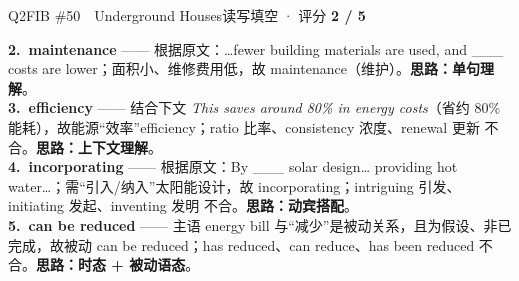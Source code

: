 \documentclass[11pt]{article}
\begin{document}
\begin{qblock}{Q2\quad FIB \#50\ \ Underground Houses}{读写填空 · 评分 \textcolor{cAccent}{\bfseries 2 / 5}}
\begin{notebox}
\textbf{2.\ maintenance} —— 根据原文：…fewer building materials are used, and \_\_\_ costs are lower；面积小、维修费用低，故 maintenance（维护）。\textbf{思路：单句理解}。\\[2pt]
\textbf{3.\ efficiency} —— 结合下文 \emph{This saves around 80\% in energy costs}（省约 80\% 能耗），故能源“效率”efficiency；ratio 比率、consistency 浓度、renewal 更新 不合。\textbf{思路：上下文理解}。\\[2pt]
\textbf{4.\ incorporating} —— 根据原文：By \_\_\_ solar design… providing hot water…；需“引入/纳入”太阳能设计，故 incorporating；intriguing 引发、initiating 发起、inventing 发明 不合。\textbf{思路：动宾搭配}。\\[2pt]
\textbf{5.\ can be reduced} —— 主语 energy bill 与“减少”是被动关系，且为假设、非已完成，故被动 can be reduced；has reduced、can reduce、has been reduced 不合。\textbf{思路：时态 + 被动语态}。
\end{notebox}
\end{qblock}
\end{document}
